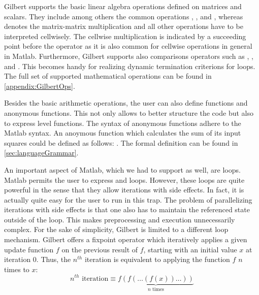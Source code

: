 Gilbert supports the basic linear algebra operations defined on matrices and scalars.
They include among others the common operations \code{+}, \code{-}, \code{/} and \code{*}, whereas \code{*} denotes the matrix-matrix multiplication and all other operations have to be interpreted cellwisely.
The cellwise multiplication is indicated by a succeeding point before the operator  as it is also common for cellwise operations in general in Matlab.
Furthermore, Gilbert supports also comparisons operators such as \code{>}, \code{>=}, \code{==} and \code{\textasciitilde=}.
This becomes handy for realizing dynamic termination criterions for loops.
The full set of supported mathematical operations can be found in \cref{appendix:GilbertOps}.

Besides the basic arithmetic operations, the user can also define functions and anonymous functions.
This not only allows to better structure the code but also to express  level functions.
The syntax of anonymous functions adhere to the Matlab syntax.
An anoymous function which calculates the sum of its input squares could be defined as follows: .
The formal definition can be found in \cref{sec:languageGrammar}.

An important aspect of Matlab, which we had to support as well, are loops.
Matlab permits the user to express  and  loops.
However, these loops are quite powerful in the sense that they allow iterations with side effects.
In fact, it is actually quite easy for the user to run in this trap.
The problem of parallelizing iterations with side effects is that one also has to maintain the referenced state outside of the loop.
This makes preprocessing and execution unnecessarily complex.
For the sake of simplicity, Gilbert is limited to a different loop mechanism.
Gilbert offers a fixpoint operator  which iteratively applies a given update function $f$ on the previous result of $f$, starting with an initial value $x$ at iteration $0$.
Thus, the $n^{th}$ iteration is equivalent to applying the function $f$ $n$ times to $x$: 
\begin{displaymath}
	n^{th}\text{ iteration}\equiv\underbrace{f(f(\ldots(f(x))\ldots))}_{\text{$n$ times}}
\end{displaymath}

